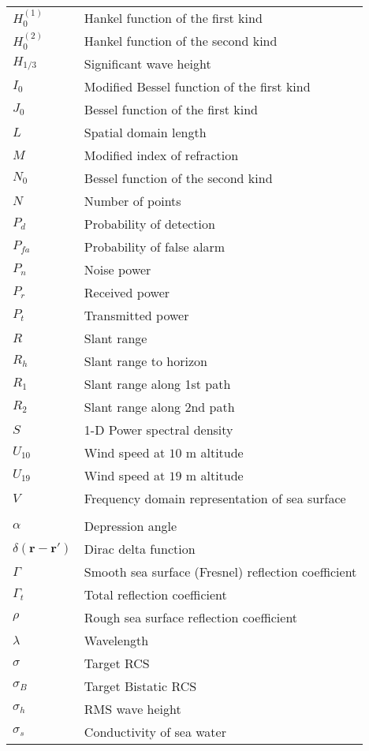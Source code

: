 \begin{supertabular}{ll}
$H_0^{(1)}$ & Hankel function of the first kind \\
$H_0^{(2)}$ & Hankel function of the second kind \\
$H_{1/3}$ & Significant wave height \\
$I_0$ & Modified Bessel function of the first kind \\
$J_0$ & Bessel function of the first kind \\
$L$ & Spatial domain length \\
$M$ & Modified index of refraction \\
$N_0$ & Bessel function of the second kind \\
$N$ & Number of points \\
$P_d$ & Probability of detection \\
$P_{fa}$ & Probability of false alarm \\
$P_n$ & Noise power\\
$P_r$ & Received power \\
$P_t$ & Transmitted power \\
$R$ & Slant range \\
$R_h$ & Slant range to horizon \\
$R_1$ & Slant range along 1st path \\
$R_2$ & Slant range along 2nd path \\
$S$ & 1-D Power spectral density \\
$U_{10}$ & Wind speed at $10$ m altitude \\
$U_{19}$ & Wind speed at $19$ m altitude \\
$V$ & Frequency domain representation of sea surface\\
\\
$\alpha$ & Depression angle \\
$\delta\left(\mathbf{r}-\mathbf{r}' \right)$ & Dirac delta function \\
$\Gamma$ & Smooth sea surface (Fresnel) reflection coefficient \\
$\Gamma_t$ & Total reflection coefficient \\
$\rho$ & Rough sea surface reflection coefficient \\
$\lambda$ & Wavelength \\
$\sigma$ & Target RCS\\
$\sigma_B$ & Target Bistatic RCS \\
$\sigma_h$ & RMS wave height \\
$\sigma_s$ & Conductivity of sea water \\

\end{supertabular}
